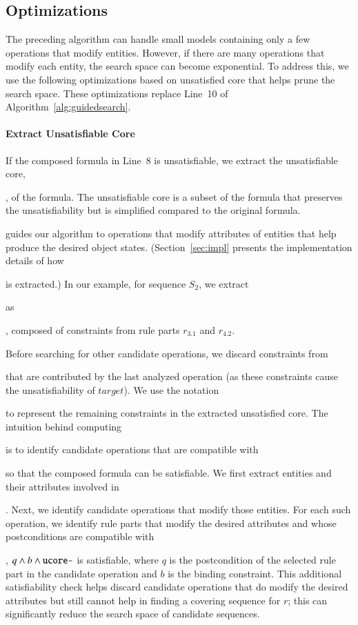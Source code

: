 \subsection{Optimizations}
\label{sec:optimization}

The preceding algorithm can handle small models containing only a few operations
that modify entities. However, if there are many operations that modify each
entity, the search space can become exponential. To address this, we use the
following optimizations based on unsatisfied core that helps prune the search
space. These optimizations replace Line~10 of Algorithm~\ref{alg:guidedsearch}.

\paragraph*{Extract Unsatisfiable Core} If the composed formula in
Line~8 is unsatisfiable, we extract the unsatisfiable core, \subject{ucore}, of
the formula. The unsatisfiable core is a subset of the formula that preserves
the unsatisfiability but is simplified compared to the original formula.
\subject{ucore} guides our algorithm to operations that modify attributes of
entities that help produce the desired object states. (Section~\ref{sec:impl}
presents the implementation details of how \subject{ucore} is extracted.) In our
example, for sequence $S_2$, we extract \subject{ucore} as \subject{ord.total =
  0 $\wedge$ ord.total > 0}, composed of constraints from rule parts $r_{3.1}$
and $r_{4.2}$.

Before searching for other candidate operations, we discard constraints from
\subject{ucore} that are contributed by the last analyzed operation (as these
constraints cause the unsatisfiability of $target$).  We use the notation
\subject{ucore-} to represent the remaining constraints in the extracted
unsatisfied core. The intuition behind computing \subject{ucore-} is to identify
candidate operations that are compatible with \subject{ucore-} so that the
composed formula can be satisfiable. We first extract entities and their
attributes involved in \subject{ucore-}. Next, we identify candidate operations
that modify those entities. For each such operation, we identify rule parts
that modify the desired attributes and whose postconditions are compatible with
\subject{ucore-}, \ie{} $q \wedge b \wedge \subject{ucore-}$ is satisfiable,
where $q$ is the postcondition of the selected rule part in the candidate
operation and $b$ is the binding constraint.  This additional satisfiability
check helps discard candidate operations that do modify the desired attributes
but still cannot help in finding a covering sequence for $r$; this can
significantly reduce the search space of candidate sequences.

